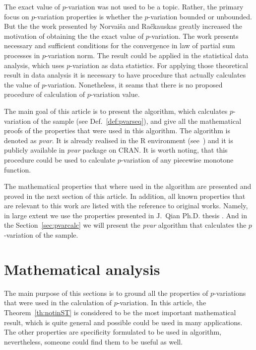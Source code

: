 \documentclass[12pt, a4paper]{article}
\numberwithin{equation}{section}
\begin{document}
  
The exact value of $p$-variation was not used to be a topic.
Rather, the primary focus on $p$-variation properties 
is whether the $p$-variation bounded or unbounded. 
But the the work \cite{NorvaisaRackauskas2008} presented by
Norvaiša and Račkauskas greatly increased the motivation
of obtaining the the exact value of $p$-variation.
The work \cite{NorvaisaRackauskas2008} presents
necessary and sufficient conditions
for the convergence in law of partial sum processes in
$p$-variation norm. 
The result could be applied in the statistical data analysis,
which uses $p$-variation as data statistics.
For applying those theoretical result in data analysis it is necessary
to have procedure that actually calculates the value of $p$-variation.
Nonetheless, it seams that there is no proposed 
procedure of calculation of $p$-variation value.

The main goal of this article is to present the algorithm,
which calculates $p$-variation of the sample
(see Def.~\ref{def:pvarseq}), and give all the mathematical proofs
of the properties that were used in this algorithm.
The algorithm is denoted as \emph{pvar}.
It is already realised in the R environment (see~\cite{R})
and it is publicly available in \emph{pvar} package on CRAN\footnotemark.
It is worth noting, that this procedure could be used to calculate
$p$-variation of any piecewise monotone function.

The mathematical properties that where used in the
algorithm are presented and proved in the next section of this article.
In addition, all known properties that are relevant to this work
are listed with the reference to original works. Namely, in large extent
we use the properties presented in J.~Qian Ph.D. thesis \cite{Qian}\footnotemark.
And in the Section~\ref{sec:pvarcalc} we will present the \emph{pvar}
algorithm that calculates the $p$-variation of the sample.



\section{Mathematical analysis}



The main purpose of this sections is to 
ground all the properties of $p$-variations 
that were used in the calculation of $p$-variation.
In this
article, the Theorem~\ref{th:notinST} is considered to
be the most important mathematical result,
which is quite general and possible could be used
in many applications. 
The other properties are specificity formulated 
to be used in algorithm, nevertheless, 
someone could find them to be useful as well.
\end{document}
